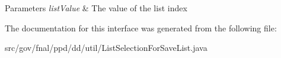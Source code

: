 \begin{DoxyParams}{Parameters}
{\em list\-Value} & The value of the list index \\
\hline
\end{DoxyParams}


The documentation for this interface was generated from the following file\-:\begin{DoxyCompactItemize}
\item 
src/gov/fnal/ppd/dd/util/List\-Selection\-For\-Save\-List.\-java\end{DoxyCompactItemize}
